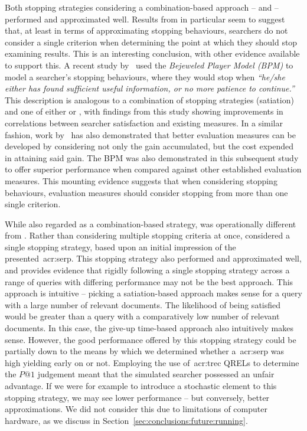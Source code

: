 Both stopping strategies considering a combination-based approach --  and  -- performed and approximated well. Results from  in particular seem to suggest that, at least in terms of approximating stopping behaviours, searchers do not consider a single criterion when determining the point at which they should stop examining results. This is an interesting conclusion, with other evidence available to support this. A recent study by~\cite{zhang2017bejewled} used the \emph{Bejeweled Player Model (BPM)} to model a searcher's stopping behaviours, where they would stop when \emph{``he/she either has found sufficient useful information, or no more patience to continue.''} This description is analogous to a combination of stopping strategies  (satiation) and one of either  or , with findings from this study showing improvements in correlations between searcher satisfaction and existing measures. In a similar fashion, work by~\cite{azzopardi2018cwl} has also demonstrated that better evaluation measures can be developed by considering not only the gain accumulated, but the cost expended in attaining said gain. The BPM was also demonstrated in this subsequent study to offer superior performance when compared against other established evaluation measures. This mounting evidence suggests that when considering stopping behaviours, evaluation measures should consider stopping from more than one single criterion.

While also regarded as a combination-based strategy,  was operationally different from . Rather than considering multiple stopping criteria at once,  considered a single stopping strategy, based upon an initial impression of the presented~\gls{acr:serp}. This stopping strategy also performed and approximated well, and provides evidence that rigidly following a single stopping strategy across a range of queries with differing performance may not be the best approach. This approach is intuitive -- picking a satiation-based approach makes sense for a query with a large number of relevant documents. The likelihood of being satisfied would be greater than a query with a comparatively low number of relevant documents. In this case, the give-up time-based approach also intuitively makes sense. However, the good performance offered by this stopping strategy could be partially down to the means by which we determined whether a~\gls{acr:serp} was high yielding early on or not. Employing the use of~\gls{acr:trec} QRELs to determine the $P@1$ judgement meant that the simulated searcher possessed an unfair advantage. If we were for example to introduce a stochastic element to this stopping strategy, we may see lower performance -- but conversely, better approximations. We did not consider this due to limitations of computer hardware, as we discuss in Section~\ref{sec:conclusions:future:running}.

